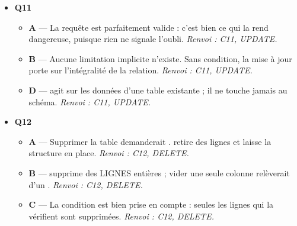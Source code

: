 \begin{itemize}
  \item \textbf{Q11}
  \begin{itemize}
    \item \textbf{A} — La requête est parfaitement valide : c'est bien ce qui la rend dangereuse, puisque rien ne signale l'oubli. \emph{Renvoi : C11, UPDATE.}
    \item \textbf{B} — Aucune limitation implicite n'existe. Sans condition, la mise à jour porte sur l'intégralité de la relation. \emph{Renvoi : C11, UPDATE.}
    \item \textbf{D} —  agit sur les données d'une table existante ; il ne touche jamais au schéma. \emph{Renvoi : C11, UPDATE.}
  \end{itemize}
  \item \textbf{Q12}
  \begin{itemize}
    \item \textbf{A} — Supprimer la table demanderait .  retire des lignes et laisse la structure en place. \emph{Renvoi : C12, DELETE.}
    \item \textbf{B} —  supprime des LIGNES entières ; vider une seule colonne relèverait d'un . \emph{Renvoi : C12, DELETE.}
    \item \textbf{C} — La condition est bien prise en compte : seules les lignes qui la vérifient sont supprimées. \emph{Renvoi : C12, DELETE.}
  \end{itemize}
\end{itemize}
\fi
